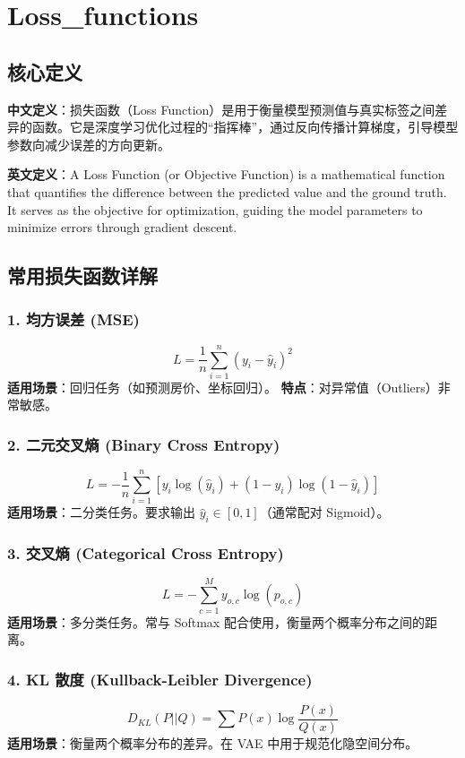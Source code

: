 \documentclass[12pt, a4paper]{book}
\begin{document}
\chapter{Loss\_functions}


\section{核心定义}
\textbf{中文定义}：损失函数（Loss Function）是用于衡量模型预测值与真实标签之间差异的函数。它是深度学习优化过程的“指挥棒”，通过反向传播计算梯度，引导模型参数向减少误差的方向更新。

\textbf{英文定义}：A Loss Function (or Objective Function) is a mathematical function that quantifies the difference between the predicted value and the ground truth. It serves as the objective for optimization, guiding the model parameters to minimize errors through gradient descent.

\section{常用损失函数详解}

\subsection{1. 均方误差 (MSE)}
$$ L = \frac{1}{n} \sum_{i=1}^n (y_i - \hat{y}_i)^2 $$
\textbf{适用场景}：回归任务（如预测房价、坐标回归）。
\textbf{特点}：对异常值（Outliers）非常敏感。

\subsection{2. 二元交叉熵 (Binary Cross Entropy)}
$$ L = -\frac{1}{n} \sum_{i=1}^n [y_i \log(\hat{y}_i) + (1 - y_i) \log(1 - \hat{y}_i)] $$
\textbf{适用场景}：二分类任务。要求输出 $\hat{y}_i \in [0, 1]$（通常配对 Sigmoid）。

\subsection{3. 交叉熵 (Categorical Cross Entropy)}
$$ L = -\sum_{c=1}^M y_{o,c} \log(p_{o,c}) $$
\textbf{适用场景}：多分类任务。常与 Softmax 配合使用，衡量两个概率分布之间的距离。

\subsection{4. KL 散度 (Kullback-Leibler Divergence)}
$$ D_{KL}(P || Q) = \sum P(x) \log \frac{P(x)}{Q(x)} $$
\textbf{适用场景}：衡量两个概率分布的差异。在 VAE 中用于规范化隐空间分布。
\end{document}
